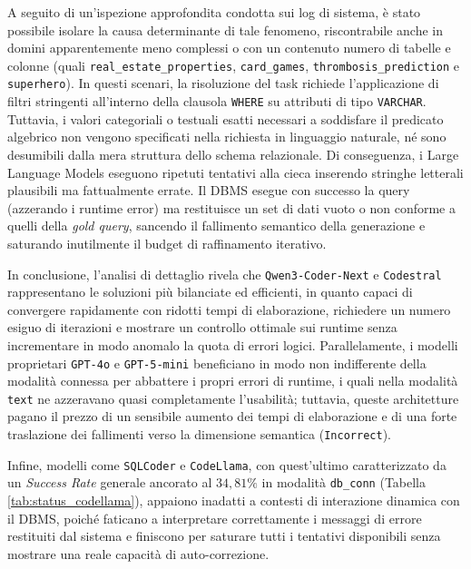 A seguito di un'ispezione approfondita condotta sui log di sistema, è
stato possibile isolare la causa determinante di tale fenomeno,
riscontrabile anche in domini apparentemente meno complessi o con un
contenuto numero di tabelle e colonne (quali
\texttt{real\_estate\_properties}, \texttt{card\_games},
\texttt{thrombosis\_prediction} e \texttt{superhero}). In questi
scenari, la risoluzione del task richiede l'applicazione di filtri
stringenti all'interno della clausola \texttt{WHERE} su attributi di
tipo \texttt{VARCHAR}. Tuttavia, i valori categoriali o testuali esatti
necessari a soddisfare il predicato algebrico non vengono specificati
nella richiesta in linguaggio naturale, né sono desumibili dalla mera
struttura dello schema relazionale. Di conseguenza, i Large Language
Models eseguono ripetuti tentativi alla cieca inserendo stringhe
letterali plausibili ma fattualmente errate. Il DBMS esegue con successo
la query (azzerando i runtime error) ma restituisce un set di dati vuoto
o non conforme a quelli della \emph{gold query}, sancendo il fallimento
semantico della generazione e saturando inutilmente il budget di
raffinamento iterativo.

In conclusione, l'analisi di dettaglio rivela che
\texttt{Qwen3-Coder-Next} e \texttt{Codestral} rappresentano le
soluzioni più bilanciate ed efficienti, in quanto capaci di convergere
rapidamente con ridotti tempi di elaborazione, richiedere un numero
esiguo di iterazioni e mostrare un controllo ottimale sui runtime senza
incrementare in modo anomalo la quota di errori logici. Parallelamente,
i modelli proprietari \texttt{GPT-4o} e \texttt{GPT-5-mini} beneficiano
in modo non indifferente della modalità connessa per abbattere i propri
errori di runtime, i quali nella modalità \texttt{text} ne azzeravano
quasi completamente l'usabilità; tuttavia, queste architetture pagano il
prezzo di un sensibile aumento dei tempi di elaborazione e di una forte
traslazione dei fallimenti verso la dimensione semantica
(\texttt{Incorrect}).

Infine, modelli come \texttt{SQLCoder} e \texttt{CodeLlama}, con
quest'ultimo caratterizzato da un \emph{Success Rate} generale ancorato
al \(34,81\%\) in modalità \texttt{db\_conn} (Tabella \ref{tab:status_codellama}), 
appaiono inadatti a contesti di interazione dinamica con il DBMS,
poiché faticano a interpretare correttamente i messaggi di errore
restituiti dal sistema e finiscono per saturare tutti i tentativi
disponibili senza mostrare una reale capacità di auto-correzione.

